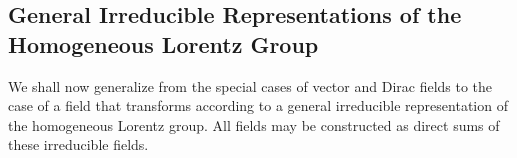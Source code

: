 
\subsection[General Irreducible Representations of the Homogeneous Lorentz Group]{General Irreducible Representations of the Homogeneous Lorentz
Group\texorpdfstring{\protect\footnotemark}{}}

We shall now generalize from the special cases of vector and Dirac fields to
the case of a field that transforms according to a general irreducible
representation of the homogeneous Lorentz group. All fields may be constructed
as direct sums of these irreducible fields.

